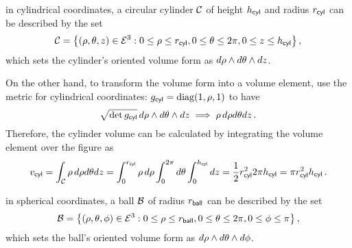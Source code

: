  in cylindrical coordinates, a circular cylinder $\mathcal{C}$ of height $h_{\text{\textsf{cyl}}}$ and radius $r_{\text{\textsf{cyl}}}$ can be described by the set
%
\begin{equation*}
  \region C = \desset{\tuple{\cxpos,\cypos,\czpos}\in\nespace 3}
                     {0\leq\cxpos\leq\rcyl,
                      0\leq\cypos\leq 2\pi,
                      0\leq\czpos\leq\hcyl
                     }\,,
\end{equation*}
%
which sets the cylinder's oriented volume form as $d\rho\wedge d\theta\wedge dz$. 

On the other hand, to transform the volume form into a volume element, use the metric for cylindrical coordinates: $\metric\sbtxt{cyl} = \diag\vat{1,\cxpos,1}$ to have
%
\begin{equation*}
  \sqrt{\det g_{\text{\textsf{cyl}}}}\,d\rho\wedge d\theta\wedge dz \implies
    \rho\,d\rho d\theta dz\,.
\end{equation*}
%
Therefore, the cylinder volume can be calculated by integrating the volume element over the figure as
%
\begin{equation*}
  v_{\text{\textsf{cyl}}} = \int_{\mathcal{C}}\rho\,d\rho d\theta dz
        = \int_{0}^{r_{\text{\textsf{cyl}}}}\rho\,d\rho \int_{0}^{2\pi}d\theta \int_{0}^{h_{\text{\textsf{cyl}}}}dz 
        = \dfrac 12 r_{\text{\textsf{cyl}}}^2 2\pi h_{\text{\textsf{cyl}}}
        = \pi r_{\text{\textsf{cyl}}}^2h_{\text{\textsf{cyl}}}\,.
\end{equation*}

 in spherical coordinates, a ball $\mathcal{B}$ of radius $r_{\text{\textsf{ball}}}$ can be described by the set
%
\begin{equation*}
  \region B = \desset{\tuple{\sxpos,\sypos,\szpos}\in\nespace 3}
                     {0\leq\sxpos\leq\rball,
                      0\leq\sypos\leq 2\pi,
                      0\leq\szpos\leq \pi
                     }\,,
\end{equation*}
%
which sets the ball's oriented volume form as $d\rho\wedge d\theta\wedge d\phi$. 

